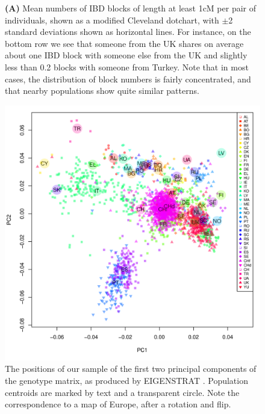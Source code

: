 \documentclass{article}
\begin{document}
\begin{figure}[!htp]
\begin{center}
    \vspace{2em}
    \caption{
    {\bf (A)} Mean numbers of IBD blocks of length at least 1cM per pair of individuals,
    shown as a modified Cleveland dotchart,
    with $\pm$2 standard deviations shown as horizontal lines.
    For instance, on the bottom row we see that someone from the UK shares on average about one IBD block with someone else from the UK
    and slightly less than 0.2 blocks with someone from Turkey.
    Note that in most cases, the distribution of block numbers is fairly concentrated,
    and that nearby populations show quite similar patterns.
    \label{sfig:dotchart_long}
    }
  \end{center}
\end{figure}


\begin{figure}[!htp]
  \begin{center}
    \includegraphics{pca-map}
    \caption{
    The positions of our sample of the first two principal components of the genotype matrix,
    as produced by EIGENSTRAT \citep{price2006eigenstrat}.
    Population centroids are marked by text and a transparent circle.
    Note the correspondence to a map of Europe, after a rotation and flip.
    \label{sfig:pca_map}
    }
  \end{center}
\end{figure}
\end{document}
